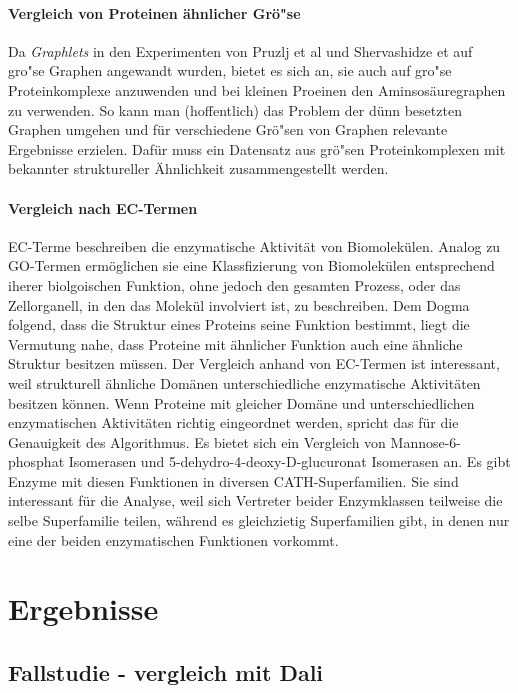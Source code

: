 \documentclass{report}
\begin{document}
\subsubsection{Vergleich von Proteinen \"ahnlicher Gr\"o"se}

Da \textit{Graphlets} in den Experimenten von Pruzlj et al und Shervashidze et auf gro"se Graphen angewandt wurden, bietet es sich an, sie auch auf gro"se Proteinkomplexe anzuwenden und bei kleinen Proeinen den Aminsos\"auregraphen zu verwenden. So kann man (hoffentlich) das Problem der d\"unn besetzten Graphen umgehen und f\"ur verschiedene Gr\"o"sen von Graphen relevante Ergebnisse erzielen. Daf\"ur muss ein Datensatz aus gr\"o"sen Proteinkomplexen mit bekannter struktureller \"Ahnlichkeit zusammengestellt werden.

\subsubsection{Vergleich nach EC-Termen}

EC-Terme beschreiben die enzymatische Aktivit\"at von Biomolek\"ulen. Analog zu GO-Termen erm\"oglichen sie eine Klassfizierung von Biomolek\"ulen entsprechend iherer biolgoischen Funktion, ohne jedoch den gesamten Prozess, oder das Zellorganell, in den das Molek\"ul involviert ist, zu beschreiben. Dem Dogma folgend, dass die Struktur eines Proteins seine Funktion bestimmt, liegt die Vermutung nahe, dass Proteine mit \"ahnlicher Funktion auch eine \"ahnliche Struktur besitzen m\"ussen. Der Vergleich anhand von EC-Termen ist interessant, weil strukturell \"ahnliche Dom\"anen unterschiedliche enzymatische Aktivit\"aten besitzen k\"onnen. Wenn Proteine mit gleicher Dom\"ane und unterschiedlichen enzymatischen Aktivit\"aten richtig eingeordnet werden, spricht das f\"ur die Genauigkeit des Algorithmus. Es bietet sich ein Vergleich von Mannose-6-phosphat Isomerasen und 5-dehydro-4-deoxy-D-glucuronat Isomerasen an. Es gibt Enzyme mit diesen Funktionen in diversen CATH-Superfamilien. Sie sind interessant f\"ur die Analyse, weil sich Vertreter beider Enzymklassen teilweise die selbe Superfamilie teilen, w\"ahrend es gleichzietig Superfamilien gibt, in denen nur eine der beiden enzymatischen Funktionen vorkommt.

\chapter{Ergebnisse}


\section{Fallstudie - vergleich mit Dali}
\end{document}

